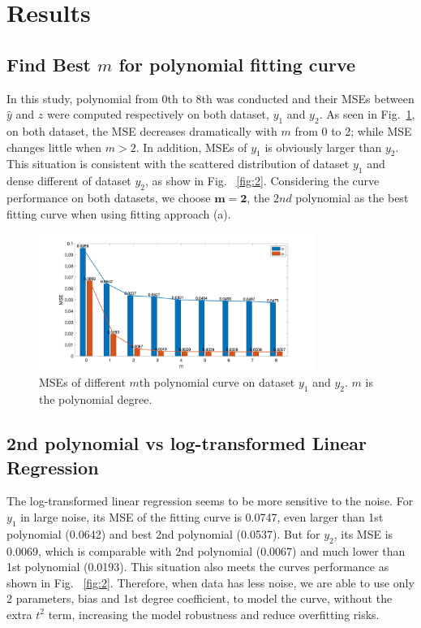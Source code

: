 \documentclass[11pt,a4paper,fleqn]{article}
\begin{document}
    \section{Results}
    \subsection{Find Best $m$ for polynomial fitting curve}
    In this study, polynomial from $0$th to $8$th was conducted and their MSEs between $\hat y$ and $z$ were computed respectively on both dataset, $y_1$ and $y_2$. As seen in Fig.~\ref{fig:1}, on both dataset, the MSE decreases dramatically with $m$ from 0 to 2; while MSE changes little when $m > 2$. In addition, MSEs of $y_1$ is obviously larger than $y_2$. This situation is consistent with the scattered distribution of dataset $y_1$ and dense different of dataset $y_2$, as show in Fig. ~\ref{fig:2}. Considering the curve performance on both datasets, we choose $\mathbf{m=2}$, the $2nd$ polynomial as the best fitting curve when using fitting approach (a).
    \begin{figure}[!h]
        \centering
        \includegraphics[width=0.8\textwidth]{m_mse.png}
        \vspace{-0.5cm}
        \caption{MSEs of different $m$th polynomial curve on dataset $y_1$ and $y_2$. $m$ is the polynomial degree.}
        \label{fig:1}
    \end{figure}

    \subsection{2nd polynomial vs log-transformed Linear Regression}
    The log-transformed linear regression seems to be more sensitive to the noise. For $y_1$ in large noise, its MSE of the fitting curve is 0.0747, even larger than 1st polynomial (0.0642) and best 2nd polynomial (0.0537). But for $y_2$, its MSE is 0.0069, which is comparable with 2nd polynomial (0.0067) and much lower than 1st polynomial (0.0193). This situation also meets the curves performance as shown in Fig. ~\ref{fig:2}. Therefore, when data has less noise, we are able to use only 2 parameters, bias and 1st degree coefficient, to model the curve, without the extra $t^2$ term, increasing the model robustness and reduce overfitting risks. 
\end{document}
